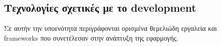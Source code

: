 \subsection{Τεχνολογίες σχετικές με το development}

Σε αυτήν την υποενότητα περιγράφονται ορισμένα θεμελιώδη εργαλεία και frameworks που συνετέλεσαν στην ανάπτυξη της εφαρμογής.





